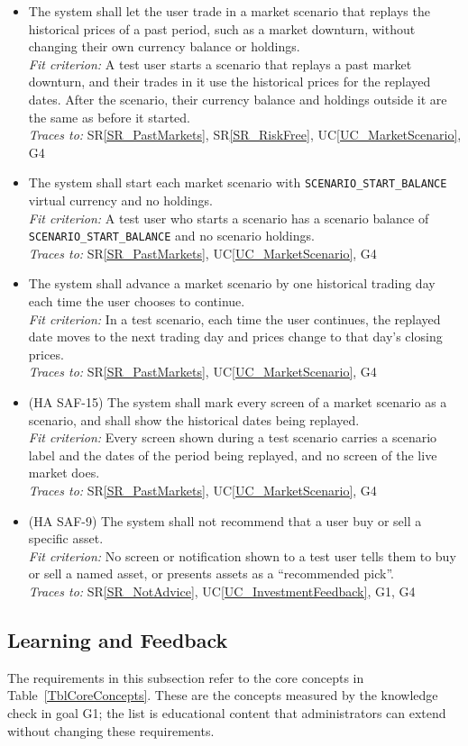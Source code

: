 \documentclass[12pt]{article}
\newcommand{\srref}[1]{SR\ref{#1}}
\newcommand{\ucref}[1]{UC\ref{#1}}
\newcounter{reqnum} %
\newcommand{\freq}[4]{%
  \item[FR\refstepcounter{reqnum}\thereqnum \label{#1}:] #2\\
  \textit{Fit criterion:} #3\\
  \textit{Traces to:} #4}
\begin{document}
\begin{itemize}
\freq{FR_MktScenario}
  {The system shall let the user trade in a market scenario that replays the
  historical prices of a past period, such as a market downturn, without
  changing their own currency balance or holdings.}
  {A test user starts a scenario that replays a past market downturn, and their
  trades in it use the historical prices for the replayed dates. After the
  scenario, their currency balance and holdings outside it are the same as
  before it started.}
  {\srref{SR_PastMarkets}, \srref{SR_RiskFree}, \ucref{UC_MarketScenario}, G4}
\freq{FR_MktScenarioStart}
  {The system shall start each market scenario with
  \texttt{SCENARIO\_START\_BALANCE} virtual currency and no holdings.}
  {A test user who starts a scenario has a scenario balance of
  \texttt{SCENARIO\_START\_BALANCE} and no scenario holdings.}
  {\srref{SR_PastMarkets}, \ucref{UC_MarketScenario}, G4}
\freq{FR_MktScenarioAdvance}
  {The system shall advance a market scenario by one historical trading day
  each time the user chooses to continue.}
  {In a test scenario, each time the user continues, the replayed date moves
  to the next trading day and prices change to that day's closing prices.}
  {\srref{SR_PastMarkets}, \ucref{UC_MarketScenario}, G4}
\freq{FR_MktScenarioLabel}
  {(HA SAF-15) The system shall mark every screen of a market scenario as a
  scenario, and shall show the historical dates being replayed.}
  {Every screen shown during a test scenario carries a scenario label and the
  dates of the period being replayed, and no screen of the live market does.}
  {\srref{SR_PastMarkets}, \ucref{UC_MarketScenario}, G4}
\freq{FR_MktNoRecommend}
  {(HA SAF-9) The system shall not recommend that a user buy or sell a
  specific asset.}
  {No screen or notification shown to a test user tells them to buy or sell a
  named asset, or presents assets as a ``recommended pick''.}
  {\srref{SR_NotAdvice}, \ucref{UC_InvestmentFeedback}, G1, G4}
\end{itemize}

\subsection{Learning and Feedback}

The requirements in this subsection refer to the core concepts in
Table~\ref{TblCoreConcepts}. These are the concepts measured by the knowledge
check in goal G1; the list is educational content that administrators can
extend without changing these requirements.
\end{document}
